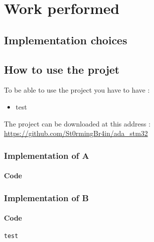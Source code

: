 \section{Work performed}

\subsection{Implementation choices}

\subsection{How to use the projet}

To be able to use the project you have to have :
\begin{itemize}
    \item test
\end{itemize}

\begin{noindent}
The project can be downloaded at this address : \\
\url{https://github.com/St0rmingBr4in/ada_stm32}
\end{noindent}

\newpage

\subsubsection{Implementation of A}

\paragraph{Code}
\noindent
\begin{centering}



\end{centering}
\newpage

\subsubsection{Implementation of B}

\paragraph{Code}
\noindent
\begin{centering}


\begin{lstlisting}
test
\end{lstlisting}
\end{centering}
\newpage
